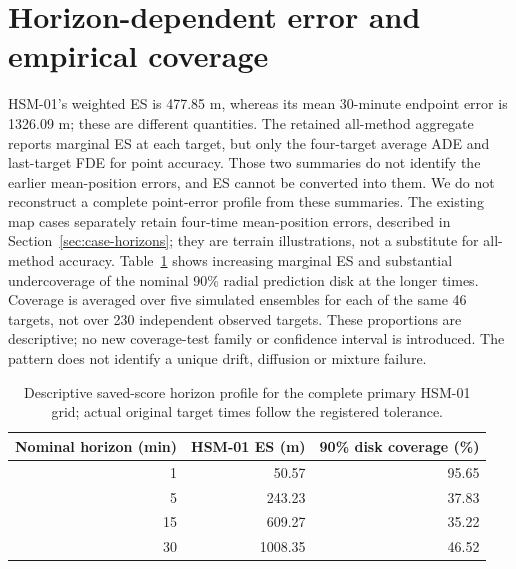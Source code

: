 \section{Horizon-dependent error and empirical coverage}
HSM-01's weighted ES is 477.85 m, whereas its mean 30-minute endpoint error
is 1326.09 m; these are different quantities.
The retained all-method aggregate reports marginal ES at each target, but
only the four-target average ADE and last-target FDE for point accuracy.
Those two summaries do not identify the earlier mean-position errors, and
ES cannot be converted into them. We do not reconstruct a complete point-error
profile from these summaries. The existing map cases separately retain
four-time mean-position errors, described in Section~\ref{sec:case-horizons};
they are terrain illustrations, not a substitute for all-method accuracy.
Table~\ref{tab:preliminary-coverage} shows increasing marginal ES and substantial
undercoverage of the nominal 90\% radial prediction disk at the longer times.
Coverage is averaged over five simulated ensembles for each of the same
46 targets, not over 230 independent observed targets. These proportions are
descriptive; no new coverage-test family or confidence interval is introduced.
The pattern does not identify a unique drift, diffusion or mixture failure.

\begin{table}[htbp]
\centering
\small
\caption{Descriptive saved-score horizon profile for the complete primary
HSM-01 grid; actual original target times follow the registered tolerance.}
\label{tab:preliminary-coverage}\hypertarget{tab:preliminary-coverage}{}
\begin{tabular}{@{}rrr@{}}
\toprule
Nominal horizon (min) & HSM-01 ES (m) & 90\% disk coverage (\%)\\
\midrule
1 & 50.57 & 95.65\\
5 & 243.23 & 37.83\\
15 & 609.27 & 35.22\\
30 & 1008.35 & 46.52\\
\bottomrule
\end{tabular}
\end{table}

